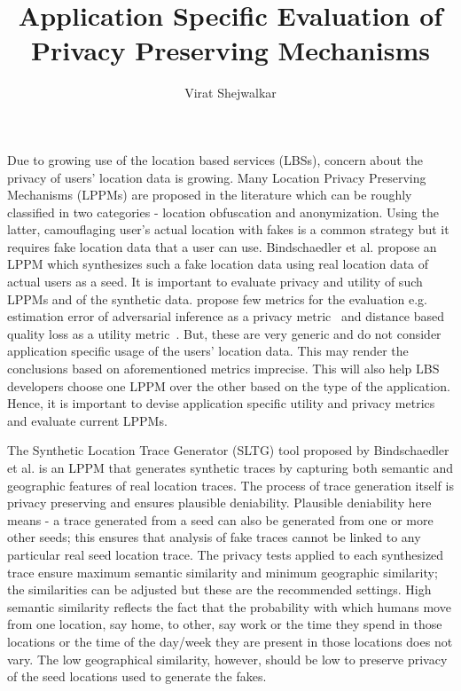 \documentclass[USenglish,oneside,twocolumn]{article}
\begin{document}
 

  \author[1]{Virat Shejwalkar}

  \title{\Large Application Specific Evaluation of Privacy Preserving Mechanisms}


  
 

\maketitle

Due to growing use of the location based services (LBSs), concern about the privacy of users' location data is growing. Many Location Privacy Preserving Mechanisms (LPPMs) are proposed in the literature which can be roughly classified in two categories - location obfuscation and anonymization. Using the latter, camouflaging user's actual location with fakes is a common strategy but it requires fake location data that a user can use. Bindschaedler et al.\cite{vincent} propose an LPPM which synthesizes such a fake location data using real location data of actual users as a seed. It is important to evaluate privacy and utility of such LPPMs and of the synthetic data. \cite{vincent, qlp, ndss15, util-imp, zarrin} propose few metrics for the evaluation e.g. estimation error of adversarial inference as a privacy metric~\cite{qlp} and distance based quality loss as a utility metric~\cite{util-imp}. But, these are very generic and do not consider application specific usage of the users' location data. This may render the conclusions based on aforementioned metrics imprecise. This will also help LBS developers choose one LPPM over the other based on the type of the application. Hence, it is important to devise application specific utility and privacy metrics and evaluate current LPPMs.

The Synthetic Location Trace Generator (SLTG) tool proposed by Bindschaedler et al.\cite{vincent} is an LPPM that generates synthetic traces by capturing both semantic and geographic features of real location traces. The process of trace generation itself is privacy preserving and ensures plausible deniability. Plausible deniability here means - a trace generated from a seed can also be generated from one or more other seeds; this ensures that analysis of fake traces cannot be linked to any particular real seed location trace. The privacy tests applied to each synthesized trace ensure maximum semantic similarity and minimum geographic similarity; the similarities can be adjusted but these are the recommended settings. High semantic similarity reflects the fact that the probability with which humans move from one location, say home, to other, say work or the time they spend in those locations or the time of the day/week they are present in those locations does not vary. The low geographical similarity, however, should be low to preserve privacy of the seed locations used to generate the fakes. 
\end{document}
